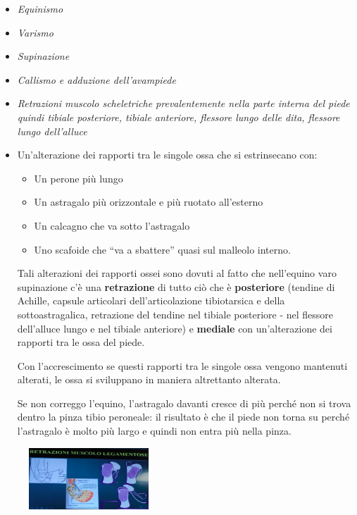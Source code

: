\begin{itemize}
\item
  \emph{Equinismo}
\item
  \emph{Varismo}
\item
  \emph{Supinazione}
\item
  \emph{Callismo e adduzione dell'avampiede}
\item
  \emph{Retrazioni muscolo scheletriche prevalentemente nella parte interna del piede quindi tibiale posteriore, tibiale anteriore, flessore lungo delle dita, flessore lungo dell'alluce}
\item
  Un'alterazione dei rapporti tra le singole ossa che si estrinsecano con:

\begin{itemize}
\item
  Un perone più lungo
\item
  Un astragalo più orizzontale e più ruotato all'esterno
\item
  Un calcagno che va sotto l'astragalo
\item
  Uno scafoide che ``va a sbattere'' quasi sul malleolo interno.
\end{itemize}

Tali alterazioni dei rapporti ossei sono dovuti al fatto che nell'equino varo supinazione c'è una \textbf{retrazione} di tutto ciò che è \textbf{posteriore} (tendine di Achille, capsule articolari dell'articolazione tibiotarsica e della sottoastragalica, retrazione del tendine nel tibiale posteriore - nel flessore dell'alluce lungo e nel tibiale anteriore) e \textbf{mediale} con un'alterazione dei rapporti tra le ossa del piede.

Con l'accrescimento se questi rapporti tra le singole ossa vengono mantenuti alterati, le ossa si sviluppano in maniera altrettanto alterata.

Se non correggo l'equino, l'astragalo davanti cresce di più perché non si trova dentro la pinza tibio peroneale: il risultato è che il piede non torna su perché l'astragalo è molto più largo e quindi non entra più
nella pinza.
\end{itemize}

\begin{figure}[!ht]
\centering
\includegraphics[width=0.4\textwidth]{016/image10.png}
\end{figure}

